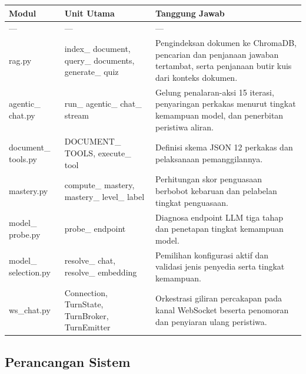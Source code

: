 \documentclass[12pt,a4paper]{article}
\begin{document}
\begin{table}[h]

\centering

\begin{tabular}{lll}

\toprule

Modul & Unit Utama & Tanggung Jawab \\

\midrule

--- & --- & --- \\

rag.py & index\_ document, query\_ documents, generate\_ quiz & Pengindeksan dokumen ke ChromaDB, pencarian dan penjanaan jawaban tertambat, serta penjanaan butir kuis dari konteks dokumen. \\

agentic\_ chat.py & run\_ agentic\_ chat\_ stream & Gelung penalaran-aksi 15 iterasi, penyaringan perkakas menurut tingkat kemampuan model, dan penerbitan peristiwa aliran. \\

document\_ tools.py & DOCUMENT\_ TOOLS, execute\_ tool & Definisi skema JSON 12 perkakas dan pelaksanaan pemanggilannya. \\

mastery.py & compute\_ mastery, mastery\_ level\_ label & Perhitungan skor penguasaan berbobot kebaruan dan pelabelan tingkat penguasaan. \\

model\_ probe.py & probe\_ endpoint & Diagnosa endpoint LLM tiga tahap dan penetapan tingkat kemampuan model. \\

model\_ selection.py & resolve\_ chat, resolve\_ embedding & Pemilihan konfigurasi aktif dan validasi jenis penyedia serta tingkat kemampuan. \\

ws\_chat.py & Connection, TurnState, TurnBroker, TurnEmitter & Orkestrasi giliran percakapan pada kanal WebSocket beserta penomoran dan penyiaran ulang peristiwa. \\

\bottomrule

\end{tabular}

\end{table}

\subsection*{Perancangan Sistem}
\end{document}
